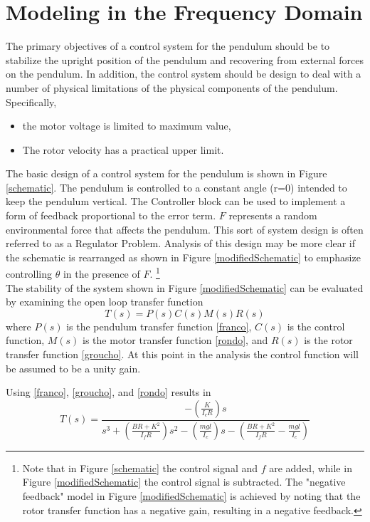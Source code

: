 \documentclass[12pt,letterpaper]{article}
\begin{document}
\section{Modeling in the Frequency Domain}
The primary objectives of a control system for the pendulum should be to stabilize the upright position of the pendulum and recovering from external forces on the pendulum.  In addition, the control system should be design to deal with a number
of physical limitations of the physical components of the pendulum.  Specifically,
\begin{itemize}
    \item the motor voltage is limited to maximum value,
    \item The rotor velocity has a practical upper limit.
\end{itemize}
The basic design of a control system for the pendulum is shown in Figure \ref{schematic}.  The pendulum is controlled
to a constant angle (r=0) intended to keep the pendulum vertical.  The Controller block can be used to implement a
form of feedback proportional to the error term.  $F$ represents a random environmental force that affects
the pendulum.  This sort of system design is often referred to as a Regulator Problem.  Analysis of this design may be more
clear if the schematic is rearranged as shown in Figure \ref{modifiedSchematic} to emphasize controlling $\theta$ in the presence of $F$.
\footnote{Note that in Figure \ref{schematic} the control signal and $f$ are added, while in Figure \ref{modifiedSchematic} the control signal is subtracted.  The "negative feedback" model in Figure \ref{modifiedSchematic} is achieved by noting that the rotor transfer function has a negative gain, 
resulting in a negative feedback.}\\

The stability of the system shown in Figure  \ref{modifiedSchematic} can be evaluated by examining the
open loop transfer function
\begin{equation}
    T(s) = P(s) C(s) M(s) R(s)
\end{equation}
where $P(s)$ is the pendulum transfer function \eqref{franco}, $C(s)$ is the control function, $M(s)$ is the motor transfer function \eqref{rondo}, and $R(s)$ is the rotor transfer function \eqref{groucho}.  
At this point in the analysis the control function will be assumed to be a unity gain.

Using \eqref{franco}, \eqref{groucho}, and \eqref{rondo} results in 
\begin{equation}
	T(s) =\frac{-(\frac{K} {I_{c}R})s}
	{s^3 + (\frac{BR+K^2}{I_{f}R})s^2 - (\frac{m g l}{I_{c}})s - (\frac{BR+K^2}{I_{f}R} - \frac{m g l}{I_{c}})}
\end{equation}
\end{document}

